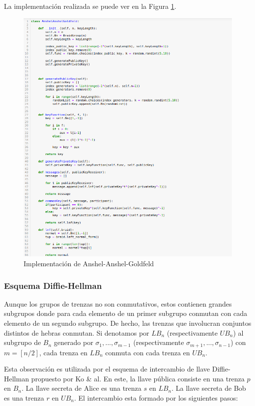 \documentclass[12pt]{article}
\theoremstyle{definition}
\begin{document}
La implementación realizada se puede ver en la Figura \ref{img:imp_anshel}.

\begin{figure}
\includegraphics[scale=0.5]{imgs/Anshel.png}
\caption{Implementación de Anshel-Anshel-Goldfeld}
\label{img:imp_anshel}
\end{figure}



\subsubsection*{Esquema Diffie-Hellman} Aunque los grupos de trenzas no son conmutativos, estos contienen grandes subgrupos donde para cada elemento de un primer subgrupo conmutan con cada elemento de un segundo subgrupo. De hecho, las trenzas que involucran conjuntos distintos de hebras conmutan. Si denotamos por $LB_n$ (respectivamente $UB_n$) al subgrupo de $B_n$ generado por $\sigma_1,...,\sigma_{m-1}$ (respectivamente $\sigma_{m+1},...,\sigma_{n-1}$) con $m=[n/2]$, cada trenza en $LB_n$ conmuta con cada trenza en $UB_n$.

Esta observación es utilizada por el esquema de intercambio de llave Diffie-Hellman propuesto por Ko \& al. En este, la llave pública consiste en una trenza $p$ en $B_n$. La llave secreta de Alice es una trenza $s$ en $LB_n$. La llave secreta de Bob es una trenza $r$ en $UB_n$. El intercambio esta formado por los siguientes pasos:
\end{document}
